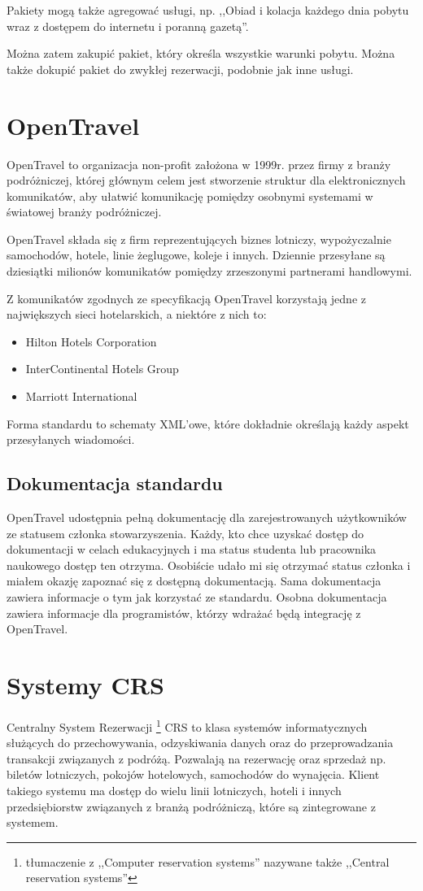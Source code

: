 \documentclass[a4paper,onecolumn,oneside,11pt,wide,floatssmall]{mwrep}
\theoremstyle{definition}
\theoremstyle{plain}%
\theoremstyle{remark}
\begin{document}
Pakiety mogą także agregować usługi, np. ,,Obiad i kolacja każdego dnia 
pobytu wraz z dostępem do internetu i poranną gazetą''. 

Można zatem zakupić pakiet, który określa wszystkie warunki pobytu. Można 
także dokupić pakiet do zwykłej rezerwacji, podobnie jak inne usługi.

\section{OpenTravel}
OpenTravel to organizacja non-profit założona w \mbox{1999r.} przez firmy z 
branży podróżniczej, której głównym celem jest stworzenie struktur dla 
elektronicznych komunikatów, aby ułatwić komunikację pomiędzy osobnymi 
systemami w światowej branży podróżniczej.

OpenTravel składa się z firm reprezentujących biznes lotniczy, wypożyczalnie 
samochodów, hotele, linie żeglugowe, koleje i innych. Dziennie przesyłane są 
dziesiątki milionów komunikatów pomiędzy zrzeszonymi partnerami handlowymi.

Z komunikatów zgodnych ze specyfikacją OpenTravel korzystają jedne z największych sieci hotelarskich, a niektóre z nich to:
\begin{itemize}
  \item Hilton Hotels Corporation
  \item InterContinental Hotels Group
  \item Marriott International
\end{itemize}

Forma standardu to schematy XML'owe, które dokładnie określają każdy aspekt 
przesyłanych wiadomości.

\subsection{Dokumentacja standardu}
OpenTravel udostępnia pełną dokumentację dla zarejestrowanych użytkowników 
ze statusem członka stowarzyszenia. Każdy, kto chce uzyskać dostęp do 
dokumentacji w celach edukacyjnych i ma status studenta lub pracownika 
naukowego dostęp ten otrzyma. Osobiście udało mi się otrzymać status członka 
i miałem okazję zapoznać się z dostępną dokumentacją.
Sama dokumentacja zawiera informacje o tym jak korzystać ze standardu. 
Osobna dokumentacja zawiera informacje dla programistów, którzy wdrażać będą 
integrację z OpenTravel.

\section{Systemy CRS}
\label{system-crs}
Centralny System Rezerwacji \footnote{tłumaczenie z ,,Computer reservation 
systems'' nazywane także ,,Central reservation systems''} CRS to klasa systemów 
informatycznych służących do przechowywania, odzyskiwania danych oraz do 
przeprowadzania transakcji związanych z podróżą. Pozwalają na rezerwację 
oraz sprzedaż np. biletów lotniczych, pokojów hotelowych, samochodów do 
wynajęcia. Klient takiego systemu ma dostęp do wielu linii lotniczych, 
hoteli i innych przedsiębiorstw związanych z branżą podróżniczą, które są 
zintegrowane z systemem.
\end{document}
